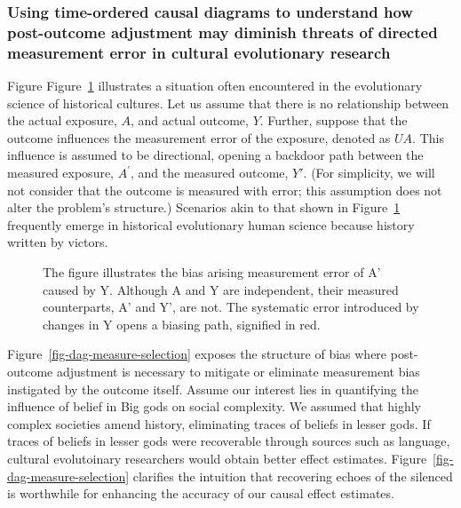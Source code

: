 \documentclass[
  singlecolumn,
  9pt]{article}
\begin{document}
\subsubsection{Using time-ordered causal diagrams to understand how
post-outcome adjustment may diminish threats of directed measurement
error in cultural evolutionary
research}\label{using-time-ordered-causal-diagrams-to-understand-how-post-outcome-adjustment-may-diminish-threats-of-directed-measurement-error-in-cultural-evolutionary-research}

Figure Figure~\ref{fig-dag-measure-selection-0} illustrates a situation
often encountered in the evolutionary science of historical cultures.
Let us assume that there is no relationship between the actual exposure,
\(A\), and actual outcome, \(Y\). Further, suppose that the outcome
influences the measurement error of the exposure, denoted as \(UA\).
This influence is assumed to be directional, opening a backdoor path
between the measured exposure, \(A^{\prime}\), and the measured outcome,
\(Y'\). (For simplicity, we will not consider that the outcome is
measured with error; this assumption does not alter the problem's
structure.) Scenarios akin to that shown in
Figure~\ref{fig-dag-measure-selection-0} frequently emerge in historical
evolutionary human science because history written by victors.

\begin{figure}


\caption{\label{fig-dag-measure-selection-0}The figure illustrates the
bias arising measurement error of A' caused by Y. Although A and Y are
independent, their measured counterparts, A' and Y', are not. The
systematic error introduced by changes in Y opens a biasing path,
signified in red.}

\end{figure}%

Figure~\ref{fig-dag-measure-selection} exposes the structure of bias
where post-outcome adjustment is necessary to mitigate or eliminate
measurement bias instigated by the outcome itself. Assume our interest
lies in quantifying the influence of belief in Big gods on social
complexity. We assumed that highly complex societies amend history,
eliminating traces of beliefs in lesser gods. If traces of beliefs in
lesser gods were recoverable through sources such as language, cultural
evolutoinary researchers would obtain better effect estimates.
Figure~\ref{fig-dag-measure-selection} clarifies the intuition that
recovering echoes of the silenced is worthwhile for enhancing the
accuracy of our causal effect estimates.
\end{document}
